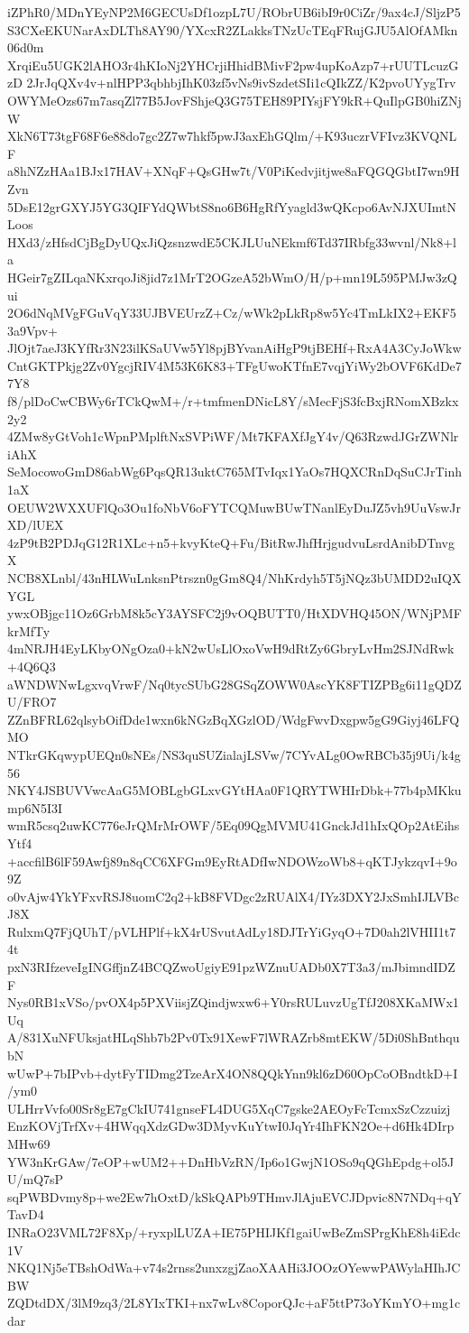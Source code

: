 iZPhR0/MDnYEyNP2M6GECUsDf1ozpL7U/RObrUB6ibI9r0CiZr/9ax4cJ/SljzP5
S3CXeEKUNarAxDLTh8AY90/YXcxR2ZLakksTNzUcTEqFRujGJU5AlOfAMkn06d0m
XrqiEu5UGK2lAHO3r4hKIoNj2YHCrjiHhidBMivF2pw4upKoAzp7+rUUTLcuzGzD
2JrJqQXv4v+nlHPP3qbhbjIhK03zf5vNs9ivSzdetSIi1cQIkZZ/K2pvoUYygTrv
OWYMeOzs67m7asqZl77B5JovFShjeQ3G75TEH89PIYsjFY9kR+QuIlpGB0hiZNjW
XkN6T73tgF68F6e88do7gc2Z7w7hkf5pwJ3axEhGQlm/+K93uczrVFIvz3KVQNLF
a8hNZzHAa1BJx17HAV+XNqF+QsGHw7t/V0PiKedvjitjwe8aFQGQGbtI7wn9HZvn
5DsE12grGXYJ5YG3QIFYdQWbtS8no6B6HgRfYyagld3wQKcpo6AvNJXUImtNLoos
HXd3/zHfsdCjBgDyUQxJiQzsnzwdE5CKJLUuNEkmf6Td37IRbfg33wvnl/Nk8+la
HGeir7gZILqaNKxrqoJi8jid7z1MrT2OGzeA52bWmO/H/p+mn19L595PMJw3zQui
2O6dNqMVgFGuVqY33UJBVEUrzZ+Cz/wWk2pLkRp8w5Yc4TmLkIX2+EKF53a9Vpv+
JlOjt7aeJ3KYfRr3N23ilKSaUVw5Yl8pjBYvanAiHgP9tjBEHf+RxA4A3CyJoWkw
CntGKTPkjg2Zv0YgcjRIV4M53K6K83+TFgUwoKTfnE7vqjYiWy2bOVF6KdDe77Y8
f8/plDoCwCBWy6rTCkQwM+/r+tmfmenDNicL8Y/sMecFjS3fcBxjRNomXBzkx2y2
4ZMw8yGtVoh1cWpnPMplftNxSVPiWF/Mt7KFAXfJgY4v/Q63RzwdJGrZWNlriAhX
SeMocowoGmD86abWg6PqsQR13uktC765MTvIqx1YaOs7HQXCRnDqSuCJrTinh1aX
OEUW2WXXUFlQo3Ou1foNbV6oFYTCQMuwBUwTNanlEyDuJZ5vh9UuVswJrXD/lUEX
4zP9tB2PDJqG12R1XLc+n5+kvyKteQ+Fu/BitRwJhfHrjgudvuLsrdAnibDTnvgX
NCB8XLnbl/43nHLWuLnksnPtrszn0gGm8Q4/NhKrdyh5T5jNQz3bUMDD2uIQXYGL
ywxOBjgc11Oz6GrbM8k5cY3AYSFC2j9vOQBUTT0/HtXDVHQ45ON/WNjPMFkrMfTy
4mNRJH4EyLKbyONgOza0+kN2wUsLlOxoVwH9dRtZy6GbryLvHm2SJNdRwk+4Q6Q3
aWNDWNwLgxvqVrwF/Nq0tycSUbG28GSqZOWW0AscYK8FTIZPBg6i11gQDZU/FRO7
ZZnBFRL62qlsybOifDde1wxn6kNGzBqXGzlOD/WdgFwvDxgpw5gG9Giyj46LFQMO
NTkrGKqwypUEQn0sNEs/NS3quSUZialajLSVw/7CYvALg0OwRBCb35j9Ui/k4g56
NKY4JSBUVVwcAaG5MOBLgbGLxvGYtHAa0F1QRYTWHIrDbk+77b4pMKkump6N5I3I
wmR5csq2uwKC776eJrQMrMrOWF/5Eq09QgMVMU41GnckJd1hIxQOp2AtEihsYtf4
+accfilB6lF59Awfj89n8qCC6XFGm9EyRtADfIwNDOWzoWb8+qKTJykzqvI+9o9Z
o0vAjw4YkYFxvRSJ8uomC2q2+kB8FVDgc2zRUAlX4/IYz3DXY2JxSmhIJLVBcJ8X
RulxmQ7FjQUhT/pVLHPlf+kX4rUSvutAdLy18DJTrYiGyqO+7D0ah2lVHII1t74t
pxN3RIfzeveIgINGffjnZ4BCQZwoUgiyE91pzWZnuUADb0X7T3a3/mJbimndIDZF
Nys0RB1xVSo/pvOX4p5PXViisjZQindjwxw6+Y0rsRULuvzUgTfJ208XKaMWx1Uq
A/831XuNFUksjatHLqShb7b2Pv0Tx91XewF7lWRAZrb8mtEKW/5Di0ShBnthqubN
wUwP+7bIPvb+dytFyTIDmg2TzeArX4ON8QQkYnn9kl6zD60OpCoOBndtkD+I/ym0
ULHrrVvfo00Sr8gE7gCkIU741gnseFL4DUG5XqC7gske2AEOyFcTcmxSzCzzuizj
EnzKOVjTrfXv+4HWqqXdzGDw3DMyvKuYtwI0JqYr4IhFKN2Oe+d6Hk4DIrpMHw69
YW3nKrGAw/7eOP+wUM2++DnHbVzRN/Ip6o1GwjN1OSo9qQGhEpdg+ol5JU/mQ7sP
sqPWBDvmy8p+we2Ew7hOxtD/kSkQAPb9THmvJlAjuEVCJDpvic8N7NDq+qYTavD4
INRaO23VML72F8Xp/+ryxplLUZA+IE75PHIJKf1gaiUwBeZmSPrgKhE8h4iEdc1V
NKQ1Nj5eTBshOdWa+v74s2rnss2unxzgjZaoXAAHi3JOOzOYewwPAWylaHIhJCBW
ZQDtdDX/3lM9zq3/2L8YIxTKI+nx7wLv8CoporQJc+aF5ttP73oYKmYO+mg1cdar
